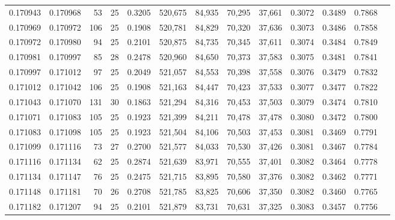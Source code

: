 \begin{tabular}{rrrrrrrrrrrrr}
0.170943 & 0.170968 &  53 &  25 &                                     0.3205 & 520,675 &  84,935 &  70,295 &  37,661 & 0.3072 & 0.3489 & 0.7868 \\
0.170969 & 0.170972 & 106 &  25 &                                     0.1908 & 520,781 &  84,829 &  70,320 &  37,636 & 0.3073 & 0.3486 & 0.7858 \\
0.170972 & 0.170980 &  94 &  25 &                                     0.2101 & 520,875 &  84,735 &  70,345 &  37,611 & 0.3074 & 0.3484 & 0.7849 \\
0.170981 & 0.170997 &  85 &  28 &                                     0.2478 & 520,960 &  84,650 &  70,373 &  37,583 & 0.3075 & 0.3481 & 0.7841 \\
0.170997 & 0.171012 &  97 &  25 &                                     0.2049 & 521,057 &  84,553 &  70,398 &  37,558 & 0.3076 & 0.3479 & 0.7832 \\
0.171012 & 0.171042 & 106 &  25 &                                     0.1908 & 521,163 &  84,447 &  70,423 &  37,533 & 0.3077 & 0.3477 & 0.7822 \\
0.171043 & 0.171070 & 131 &  30 &                                     0.1863 & 521,294 &  84,316 &  70,453 &  37,503 & 0.3079 & 0.3474 & 0.7810 \\
0.171071 & 0.171083 & 105 &  25 &                                     0.1923 & 521,399 &  84,211 &  70,478 &  37,478 & 0.3080 & 0.3472 & 0.7800 \\
0.171083 & 0.171098 & 105 &  25 &                                     0.1923 & 521,504 &  84,106 &  70,503 &  37,453 & 0.3081 & 0.3469 & 0.7791 \\
0.171099 & 0.171116 &  73 &  27 &                                     0.2700 & 521,577 &  84,033 &  70,530 &  37,426 & 0.3081 & 0.3467 & 0.7784 \\
0.171116 & 0.171134 &  62 &  25 &                                     0.2874 & 521,639 &  83,971 &  70,555 &  37,401 & 0.3082 & 0.3464 & 0.7778 \\
0.171134 & 0.171147 &  76 &  25 &                                     0.2475 & 521,715 &  83,895 &  70,580 &  37,376 & 0.3082 & 0.3462 & 0.7771 \\
0.171148 & 0.171181 &  70 &  26 &                                     0.2708 & 521,785 &  83,825 &  70,606 &  37,350 & 0.3082 & 0.3460 & 0.7765 \\
0.171182 & 0.171207 &  94 &  25 &                                     0.2101 & 521,879 &  83,731 &  70,631 &  37,325 & 0.3083 & 0.3457 & 0.7756 \\

\end{tabular}
